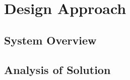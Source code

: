 \chapter{Design Approach} %
\label{cha:design_approach}


\section{System Overview} %
\label{sec:system_overview}



\section{Analysis of Solution} %
\label{sec:analysis_of_solution}



